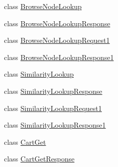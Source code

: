 \begin{DoxyCompactItemize}
class \hyperlink{class_amazon___price___finder_1_1amazon_1_1ecs_1_1_browse_node_lookup}{Browse\-Node\-Lookup}
\begin{DoxyCompactList}\small\item\em \end{DoxyCompactList}\item 
class \hyperlink{class_amazon___price___finder_1_1amazon_1_1ecs_1_1_browse_node_lookup_response}{Browse\-Node\-Lookup\-Response}
\begin{DoxyCompactList}\small\item\em \end{DoxyCompactList}\item 
class \hyperlink{class_amazon___price___finder_1_1amazon_1_1ecs_1_1_browse_node_lookup_request1}{Browse\-Node\-Lookup\-Request1}
\item 
class \hyperlink{class_amazon___price___finder_1_1amazon_1_1ecs_1_1_browse_node_lookup_response1}{Browse\-Node\-Lookup\-Response1}
\item 
class \hyperlink{class_amazon___price___finder_1_1amazon_1_1ecs_1_1_similarity_lookup}{Similarity\-Lookup}
\begin{DoxyCompactList}\small\item\em \end{DoxyCompactList}\item 
class \hyperlink{class_amazon___price___finder_1_1amazon_1_1ecs_1_1_similarity_lookup_response}{Similarity\-Lookup\-Response}
\begin{DoxyCompactList}\small\item\em \end{DoxyCompactList}\item 
class \hyperlink{class_amazon___price___finder_1_1amazon_1_1ecs_1_1_similarity_lookup_request1}{Similarity\-Lookup\-Request1}
\item 
class \hyperlink{class_amazon___price___finder_1_1amazon_1_1ecs_1_1_similarity_lookup_response1}{Similarity\-Lookup\-Response1}
\item 
class \hyperlink{class_amazon___price___finder_1_1amazon_1_1ecs_1_1_cart_get}{Cart\-Get}
\begin{DoxyCompactList}\small\item\em \end{DoxyCompactList}\item 
class \hyperlink{class_amazon___price___finder_1_1amazon_1_1ecs_1_1_cart_get_response}{Cart\-Get\-Response}
\begin{DoxyCompactList}\small\item\em \end{DoxyCompactList}\item 

\end{DoxyCompactItemize}
